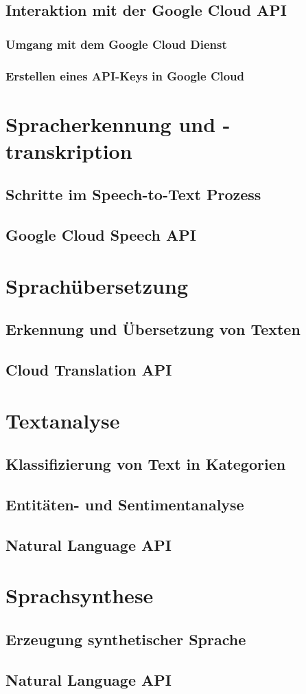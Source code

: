 \documentclass[12pt,a4paper]{article}
\begin{document}
\newpage
\subsection{Interaktion mit der Google Cloud API}
\subsubsection{Umgang mit dem Google Cloud Dienst}	
\subsubsection{Erstellen eines API-Keys in Google Cloud}




\newpage
\section{Spracherkennung und -transkription}
\subsection{Schritte im Speech-to-Text Prozess}
\subsection{Google Cloud Speech API}


\newpage

\section{Sprachübersetzung}
\subsection{Erkennung und Übersetzung von Texten}
\subsection{Cloud Translation API}

\newpage

\section{Textanalyse}
\subsection{Klassifizierung von Text in Kategorien}
\subsection{Entitäten- und Sentimentanalyse}
\subsection{Natural Language API}

\newpage

\section{Sprachsynthese}
\subsection{Erzeugung synthetischer Sprache}
\subsection{Natural Language API}

\newpage
\thispagestyle{empty}
\printbibliography
\end{document}
